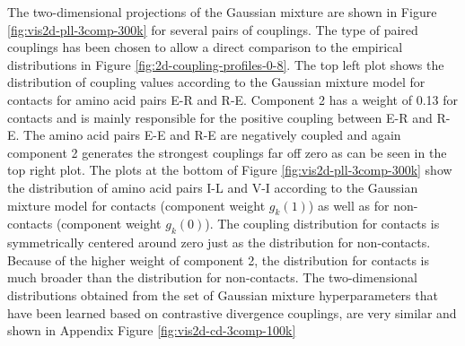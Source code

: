 \documentclass[11pt,a4paper,twoside]{book}
\theoremstyle{definition}
\theoremstyle{definition}
\theoremstyle{remark}
\begin{document}
The two-dimensional projections of the Gaussian mixture are shown in
Figure \ref{fig:vis2d-pll-3comp-300k} for several pairs of couplings.
The type of paired couplings has been chosen to allow a direct
comparison to the empirical distributions in Figure
\ref{fig:2d-coupling-profiles-0-8}. The top left plot shows the
distribution of coupling values according to the Gaussian mixture model
for contacts for amino acid pairs E-R and R-E. Component 2 has a weight
of 0.13 for contacts and is mainly responsible for the positive coupling
between E-R and R-E. The amino acid pairs E-E and R-E are negatively
coupled and again component 2 generates the strongest couplings far off
zero as can be seen in the top right plot. The plots at the bottom of
Figure \ref{fig:vis2d-pll-3comp-300k} show the distribution of amino
acid pairs I-L and V-I according to the Gaussian mixture model for
contacts (component weight \(g_k(1)\)) as well as for non-contacts
(component weight \(g_k(0)\)). The coupling distribution for contacts is
symmetrically centered around zero just as the distribution for
non-contacts. Because of the higher weight of component 2, the
distribution for contacts is much broader than the distribution for
non-contacts. The two-dimensional distributions obtained from the set of
Gaussian mixture hyperparameters that have been learned based on
contrastive divergence couplings, are very similar and shown in Appendix
Figure \ref{fig:vis2d-cd-3comp-100k}
\end{document}
